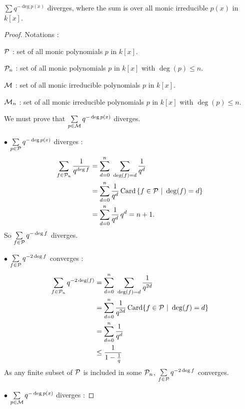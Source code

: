 \documentclass[11pt,a4paper]{article}
\begin{document}
{{$\sum q^{-\deg p(x)}$ diverges, where the sum is over all monic irreducible $p(x)$ in $k[x]$.
}
\begin{proof}
Notations :

${\cal P}$ : set of all monic polynomials $p$ in $k[x]$.

${\cal P}_n$ :  set of all monic polynomials $p$ in $k[x]$ with $\deg(p) \leq n$.

${\cal M}$ : set of all monic irreducible polynomials $p$ in $k[x]$.

${\cal M}_n$ : set of all monic irreducible polynomials $p$ in $k[x]$ with $\deg(p) \leq n$.

We must prove that $\sum\limits_{p \in {\cal M}} q^{-\deg p(x)}$ diverges.

$\bullet$ $\sum\limits_{p \in {\cal P}} q^{-\deg p(x)}$ diverges : 
\begin{align*}
\sum_{f\in{\cal P}_n} \frac{1}{q^{\deg f}} &= \sum_{d=0}^n\  \sum_{\deg(f) = d} \frac{1}{q^d}\\
&=\sum_{d=0}^n \frac{1}{q^d}\, \mathrm{Card}\, \{f \in {\cal P}\  \vert \ \deg(f) = d\}\\
&= \sum_{d=0}^n \frac{1}{q^d}\,  q^d = n+1.
\end{align*}
So $\sum\limits_{ f \in \cal P} q^{-\deg f}$ diverges.

$\bullet$ $\sum\limits_{ f \in \cal P} q^{-2\deg f}$ converges :
\begin{align*}
\sum_{f \in{\cal P}_n} q^{-2\deg(f)} &= \sum_{d=0}^n\ \sum_{\deg(f) = d} \frac{1}{q^{2d}}\\
&=\sum_{d=0}^n \frac{1}{q^{2d}} \, \mathrm{Card} \{f \in {\cal P} \ \vert \ \deg(f) = d\}\\
&= \sum_{d=0}^n \frac{1}{q^{d}}\\
&\leq \frac{1}{1-\frac{1}{q}}
\end{align*}
As any finite subset of ${\cal P}$ is included in some ${\cal P}_n$, $\sum\limits_{ f \in \cal P} q^{-2\deg f}$ converges.

$\bullet$ $\sum\limits_{p \in {\cal M}} q^{-\deg p(x)}$ diverges :


\end{proof}}
\end{document}
